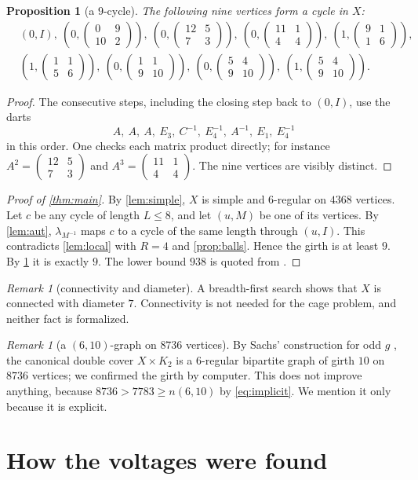 \documentclass[11pt]{article}
\numberwithin{equation}{section}
\newtheorem{proposition}[theorem]{Proposition}
\theoremstyle{definition}
\theoremstyle{remark}
\newtheorem{remark}[theorem]{Remark}
\newcommand{\mat}[4]{\left(\begin{smallmatrix}#1&#2\\#3&#4\end{smallmatrix}\right)}
\begin{document}
\begin{proposition}[a $9$-cycle]\label{prop:nine}
The following nine vertices form a cycle in $X$:
\[
\begin{aligned}
&(0,I),\ (0,\mat{0}{9}{10}{2}),\ (0,\mat{12}{5}{7}{3}),\ (0,\mat{11}{1}{4}{4}),\ (1,\mat{9}{1}{1}{6}),\\
&(1,\mat{1}{1}{5}{6}),\ (0,\mat{1}{1}{9}{10}),\ (0,\mat{5}{4}{9}{10}),\ (1,\mat{5}{4}{9}{10}).
\end{aligned}
\]
\end{proposition}
\begin{proof}
The consecutive steps, including the closing step back to $(0,I)$, use the darts
\[
  A,\ A,\ A,\ E_3,\ C^{-1},\ E_4^{-1},\ A^{-1},\ E_1,\ E_4^{-1}
\]
in this order. One checks
each matrix product directly; for instance $A^2=\mat{12}{5}{7}{3}$ and $A^3=\mat{11}{1}{4}{4}$.
The nine vertices are visibly distinct.
\end{proof}

\begin{proof}[Proof of \cref{thm:main}]
By \cref{lem:simple}, $X$ is simple and $6$-regular on $4368$ vertices. Let $c$ be any cycle of
length $L\le 8$, and let $(u,M)$ be one of its vertices. By \cref{lem:aut},
$\lambda_{M^{-1}}$ maps $c$ to a cycle of the same length through $(u,I)$. This contradicts
\cref{lem:local} with $R=4$ and \cref{prop:balls}. Hence the girth is at least $9$.
By \cref{prop:nine} it is exactly $9$. The lower bound $938$ is quoted from \cite{EGJSV}.
\end{proof}

\begin{remark}[connectivity and diameter]
A breadth-first search shows that $X$ is connected with diameter $7$. Connectivity is not needed
for the cage problem, and neither fact is formalized.
\end{remark}

\begin{remark}[a $(6,10)$-graph on $8736$ vertices]
By Sachs' construction for odd $g$ \cite[Theorem~5]{ExJa}, the canonical double cover
$X\times K_2$ is a $6$-regular bipartite graph of girth $10$ on $8736$ vertices; we confirmed the
girth by computer. This does not improve anything, because $8736>7783\ge n(6,10)$ by
\eqref{eq:implicit}. We mention it only because it is explicit.
\end{remark}

\section{How the voltages were found}\label{sec:search}
\end{document}
